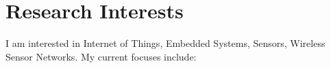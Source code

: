 
\section{Research Interests}
I am interested in Internet of Things, Embedded Systems, Sensors, Wireless Sensor Networks. My current focuses include:

